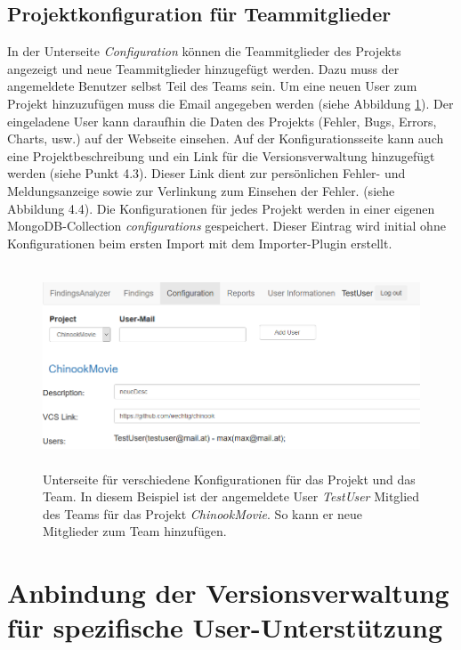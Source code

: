 \subsection{Projektkonfiguration für Teammitglieder}
In der Unterseite \textit{Configuration} können die Teammitglieder des Projekts angezeigt und neue Teammitglieder hinzugefügt werden. Dazu muss der angemeldete Benutzer selbst Teil des Teams sein. Um eine neuen User zum Projekt hinzuzufügen muss die Email angegeben werden (siehe Abbildung \ref{fig:configuration}). Der eingeladene User kann daraufhin die Daten des Projekts (Fehler, Bugs, Errors, Charts, usw.) auf der Webseite einsehen. Auf der Konfigurationsseite kann auch eine Projektbeschreibung und ein Link für die Versionsverwaltung hinzugefügt werden (siehe Punkt 4.3). Dieser Link dient zur persönlichen Fehler- und Meldungsanzeige sowie zur Verlinkung zum Einsehen der Fehler. (siehe Abbildung 4.4). Die Konfigurationen für jedes Projekt werden in einer eigenen MongoDB-Collection \textit{configurations} gespeichert. Dieser Eintrag wird initial ohne Konfigurationen beim ersten Import mit dem Importer-Plugin  erstellt.
\begin{figure}[tp]
  \centering
  \includegraphics[height=6cm]{images/configuration.PNG}
 \caption[Konfiguration für das Projekt und Team]{Unterseite für verschiedene Konfigurationen für das Projekt und das Team. In diesem Beispiel ist der angemeldete User \textit{TestUser} Mitglied des Teams für das Projekt \textit{ChinookMovie}. So kann er neue Mitglieder zum Team hinzufügen.}
  \label{fig:configuration}
\end{figure}
\section{Anbindung der Versionsverwaltung für spezifische User-Unterstützung}

